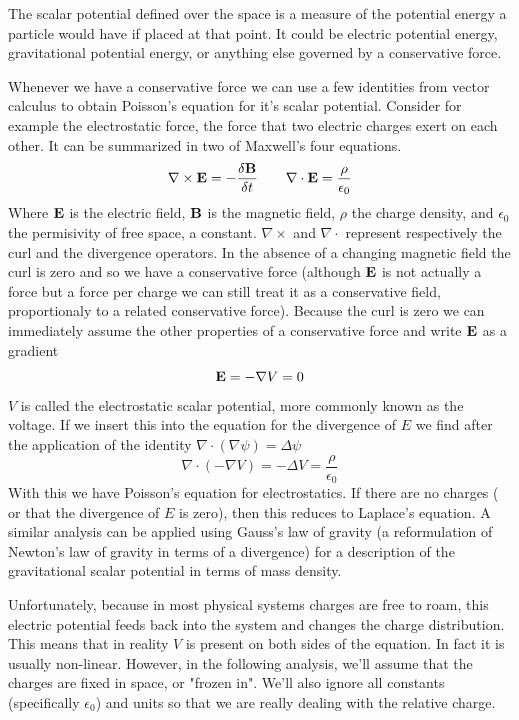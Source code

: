 The scalar potential defined over the space is a measure of the potential energy a particle would have if placed at that point.
It could be electric potential energy, gravitational potential energy, or anything else governed by a conservative force.

Whenever we have a conservative force we can use a few identities from vector calculus to obtain Poisson's equation for it's scalar potential. 
Consider for example the electrostatic force, the force that two electric charges exert on each other. 
It can be summarized in two of Maxwell's four equations.
\[\nabla \times \bold{E} = -\frac{\delta \bold{B} } {\delta t} \qquad
\nabla \cdot \bold{E} = \frac{\rho}{\epsilon_0}\]
Where $\bold{E}$ is the electric field, $\bold{B}$ is the magnetic field, $\rho$ the charge density, and $\epsilon_0$ the permisivity of free space, a constant. $\nabla \times$ and $\nabla \cdot$ represent respectively the curl and the divergence operators. In the absence of a changing magnetic field the curl is zero and so we have a conservative force (although $\bold{E}$ is not actually a force but a force per charge we can still treat it as a conservative field, proportionaly to a related conservative force). Because the curl is zero we can immediately assume the other properties of a conservative force and write $\bold{E}$ as a gradient
\[\bold{E}  = - \nabla V = 0\]
$V$ is called the electrostatic scalar potential, more commonly known as the voltage. 
If we insert this into the equation for the divergence of $E$ we find after the application of the identity $\nabla \cdot (\nabla\psi) = \Delta \psi$
\[\nabla \cdot ( - \nabla V) = - \Delta V = \frac {\rho}{\epsilon_0}\]
With this we have Poisson's equation for electrostatics. 
If there are no charges ( or that the divergence of $E$ is zero), then this reduces to Laplace's equation. 
A similar analysis can be applied using Gauss's law of gravity (a reformulation of Newton's law of gravity in terms of a divergence) for a description of the gravitational scalar potential in terms of mass density.

Unfortunately, because in most physical systems charges are free to roam, this electric potential feeds back into the system and changes the charge distribution. 
This means that in reality $V$ is present on both sides of the equation.
In fact it is usually non-linear. 
However, in the following analysis, we'll assume that the charges are fixed in space, or "frozen in".
We'll also ignore all constants (specifically $\epsilon_0$) and units so that we are really dealing with the relative charge.

